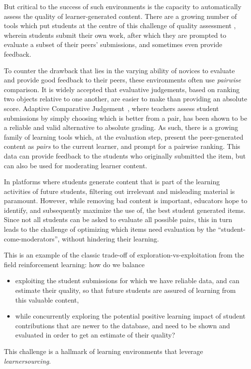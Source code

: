 \documentclass[runningheads]{llncs}
\begin{document}
But critical to the success of such environments is the capacity to 
automatically assess the quality of learner-generated content.
There are a growing number of tools which put students at the centre of this 
challenge of quality assessment
\cite{potter_compair:_2017}\cite{cambre_juxtapeer:_2018},
wherein students submit their own work, after which they are prompted to 
evaluate a subset of their peers' submissions, and sometimes even provide 
feedback.

To counter the drawback that lies in the varying ability of novices to evaluate 
and provide good feedback to their peers, these environments often use 
\textit{pairwise} comparison. 
It is widely accepted that evaluative judgements, based on ranking two objects 
relative to one another, are easier to make than providing an absolute score. 
Adaptive Comparative Judgement~\cite{pollitt_method_2012}, where teachers 
assess student submissions by simply choosing which is better from a pair, has 
been shown to be a reliable and valid alternative to absolute grading.
As such, there is a growing family of learning tools which, at the evaluation 
step, present the peer-generated content as \textit{pairs} to the current 
learner, and prompt for a pairwise ranking. 
This data can provide feedback to the students who originally submitted the 
item, but can also be used for moderating learner content.

In platforms where students generate content that is part of the learning 
activities of future students, filtering out irrelevant and misleading material 
is paramount. 
However, while removing bad content is important, educators hope to identify, 
and subsequently maximize the use of, the best student generated items.
Since not all students can be asked to evaluate all possible pairs, this in 
turn leads to the challenge of optimizing which items need evaluation by the 
``student-come-moderators'', without hindering their learning.
 
This is an example of the classic trade-off of exploration-vs-exploitation from 
the field reinforcement learning: how do we balance
\begin{itemize}
	\item exploiting the student 
	submissions for which we have reliable data, and can estimate their 
	quality, so that future students are assured of learning from this valuable 
	content, 
	\item while concurrently exploring the potential positive learning impact 
	of student contributions that are newer to the database, and need to be 
	shown and evaluated in order to get an estimate of their 
	quality?~\cite{williams_axis:_2016} 
\end{itemize}  
This challenge is a hallmark of learning environments that leverage 
\textit{learnersourcing}\cite{weir_learnersourcing_2015}.
\end{document}
